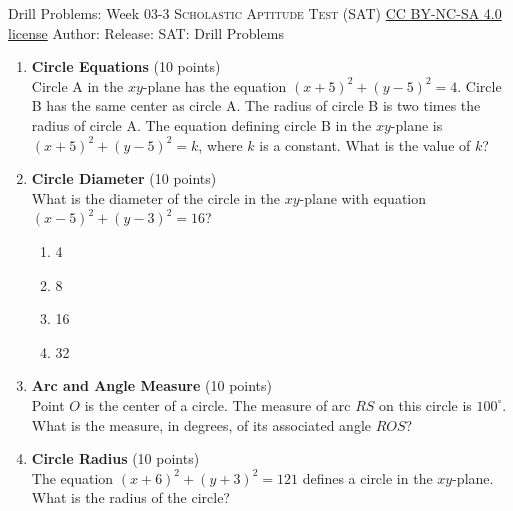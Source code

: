 \newpage\handout
{Drill Problems: Week 03-3}
{\textsc{Scholastic Aptitude Test (SAT)}}
{\href{https://creativecommons.org/licenses/by-nc-sa/4.0/}{CC BY-NC-SA 4.0 license}}
{Author: \BookAuthor}{Release: \generatedOn}
{SAT: Drill Problems}


\begin{enumerate}
  \item \textbf{Circle Equations} (10 points)\\
  Circle A in the $xy$-plane has the equation $(x+5)^2+(y-5)^2=4$. Circle B has the same center as circle A. The radius of circle B is two times the radius of circle A. The equation defining circle B in the $xy$-plane is $(x+5)^2+(y-5)^2=k$, where $k$ is a constant. What is the value of $k$?
  \begin{subanswer}
  \end{subanswer}

  \item \textbf{Circle Diameter} (10 points)\\
  What is the diameter of the circle in the $xy$-plane with equation $(x-5)^2+(y-3)^2=16$?\\
  \begin{enumerate}[label=(\Alph*)]
    \item 4
    \item 8
    \item 16
    \item 32
  \end{enumerate}
  \begin{subanswer}
  \end{subanswer}

  \item \textbf{Arc and Angle Measure} (10 points)\\
  Point $O$ is the center of a circle. The measure of arc $RS$ on this circle is $100^{\circ}$. What is the measure, in degrees, of its associated angle $ROS$?
  \begin{subanswer}
  \end{subanswer}

  \item \textbf{Circle Radius} (10 points)\\
  The equation $(x+6)^2+(y+3)^2=121$ defines a circle in the $xy$-plane. What is the radius of the circle?
  \begin{subanswer}
  \end{subanswer}


\end{enumerate}
